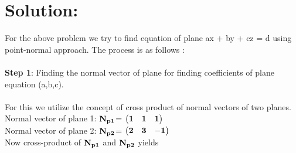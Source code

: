 \documentclass[twocolumn]{article}
\let\vec\mathbf
\begin{document}
\section*{Solution:}
For the above problem we try to find equation of plane ax + by + cz = d using point-normal approach. The process is as follows :
\\
\\\textbf{Step 1}: Finding the normal vector of plane for finding coefficients of plane equation (a,b,c).
\\
\\ For this we utilize the concept of cross product of normal vectors of two planes.
\\\hspace*{0.5cm} Normal vector of plane 1: ${\bf \vec{N_{p1}}}$= $\begin{pmatrix}{\bf1}&{\bf1}&{\bf1}\end{pmatrix}$
\\\hspace*{0.5cm}
 Normal vector of plane 2: ${\bf \vec{N_{p2}}}$= $\begin{pmatrix}{\bf2}&{\bf3}&{\bf-1}\end{pmatrix}$
\\Now cross-product of ${\bf \vec{N_{p1}}}$ and ${\bf \vec{N_{p2}}}$ yields
\end{document}
